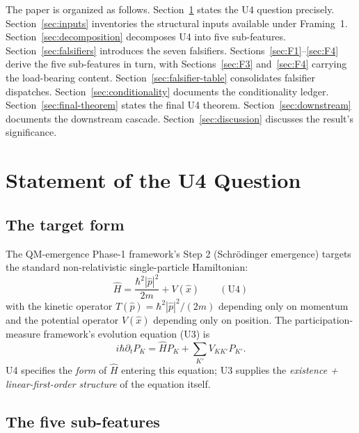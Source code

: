 \documentclass[11pt,a4paper]{article}
\begin{document}
The paper is organized as follows. Section~\ref{sec:question} states the U4 question precisely. Section~\ref{sec:inputs} inventories the structural inputs available under Framing~1. Section~\ref{sec:decomposition} decomposes U4 into five sub-features. Section~\ref{sec:falsifiers} introduces the seven falsifiers. Sections~\ref{sec:F1}--\ref{sec:F4} derive the five sub-features in turn, with Sections~\ref{sec:F3} and~\ref{sec:F4} carrying the load-bearing content. Section~\ref{sec:falsifier-table} consolidates falsifier dispatches. Section~\ref{sec:conditionality} documents the conditionality ledger. Section~\ref{sec:final-theorem} states the final U4 theorem. Section~\ref{sec:downstream} documents the downstream cascade. Section~\ref{sec:discussion} discusses the result's significance.

\section{Statement of the U4 Question}\label{sec:question}

\subsection{The target form}

The QM-emergence Phase-1 framework's Step 2 (Schr\"odinger emergence) targets the standard non-relativistic single-particle Hamiltonian:
\begin{equation}
\hat{H} = \frac{\hbar^2 |\hat{p}|^2}{2m} + V(\hat{x}) \qquad (\text{U4})
\label{eq:U4target}
\end{equation}
with the kinetic operator $T(\hat{p}) = \hbar^2 |\hat{p}|^2 / (2m)$ depending only on momentum and the potential operator $V(\hat{x})$ depending only on position. The participation-measure framework's evolution equation (U3) is
\[
i\hbar \partial_t P_K = \hat{H} P_K + \sum_{K'} V_{KK'} P_{K'}.
\]
U4 specifies the \emph{form} of $\hat{H}$ entering this equation; U3 supplies the \emph{existence + linear-first-order structure} of the equation itself.

\subsection{The five sub-features}
\end{document}
